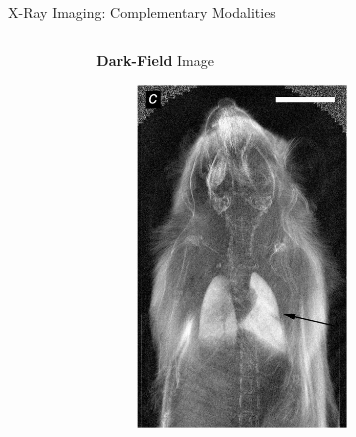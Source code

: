 \documentclass[
 ]{beamer}%
\begin{document}
\begin{frame}{X-Ray Imaging: Complementary Modalities}
\begin{columns}
\begin{column}{.315\textwidth}
\begin{figure}[ht]
                \scriptsize\cite{Bech2013}
            \end{figure}
        \end{column}
        \begin{column}{.315\textwidth}
            \textbf{Dark-Field} Image
            \begin{figure}[ht]
                \centering
                \includegraphics[width=0.63\textwidth]{images/XRay_DarkField_Contrast.jpg}
                
                \scriptsize\cite{Bech2013}
            \end{figure}
        \end{column}
    \end{columns}    
\end{frame}
\end{document}
